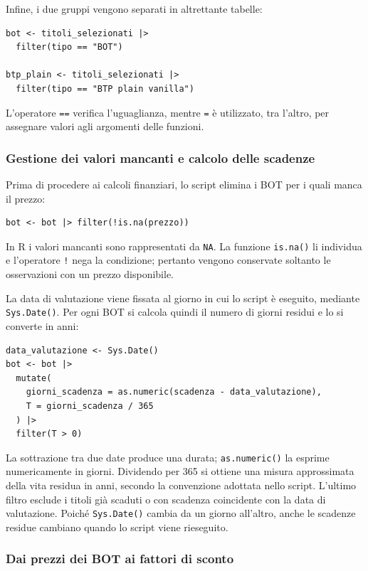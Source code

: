 Infine, i due gruppi vengono separati in altrettante tabelle:
\begin{verbatim}
bot <- titoli_selezionati |>
  filter(tipo == "BOT")

btp_plain <- titoli_selezionati |>
  filter(tipo == "BTP plain vanilla")
\end{verbatim}
L'operatore \texttt{==} verifica l'uguaglianza, mentre \texttt{=} è utilizzato, tra l'altro, per assegnare valori agli argomenti delle funzioni.

\subsubsection{Gestione dei valori mancanti e calcolo delle scadenze}

Prima di procedere ai calcoli finanziari, lo script elimina i BOT per i quali manca il prezzo:
\begin{verbatim}
bot <- bot |> filter(!is.na(prezzo))
\end{verbatim}
In R i valori mancanti sono rappresentati da \texttt{NA}. La funzione \texttt{is.na()} li individua e l'operatore \texttt{!} nega la condizione; pertanto vengono conservate soltanto le osservazioni con un prezzo disponibile.

La data di valutazione viene fissata al giorno in cui lo script è eseguito, mediante \texttt{Sys.Date()}. Per ogni BOT si calcola quindi il numero di giorni residui e lo si converte in anni:
\begin{verbatim}
data_valutazione <- Sys.Date()
bot <- bot |>
  mutate(
    giorni_scadenza = as.numeric(scadenza - data_valutazione),
    T = giorni_scadenza / 365
  ) |>
  filter(T > 0)
\end{verbatim}
La sottrazione tra due date produce una durata; \texttt{as.numeric()} la esprime numericamente in giorni. Dividendo per 365 si ottiene una misura approssimata della vita residua in anni, secondo la convenzione adottata nello script. L'ultimo filtro esclude i titoli già scaduti o con scadenza coincidente con la data di valutazione. Poiché \texttt{Sys.Date()} cambia da un giorno all'altro, anche le scadenze residue cambiano quando lo script viene rieseguito.

\subsubsection{Dai prezzi dei BOT ai fattori di sconto}

